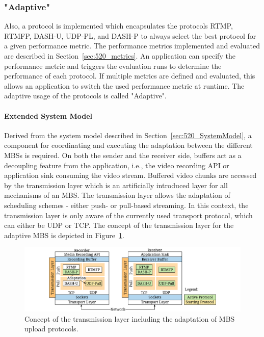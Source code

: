 \subsubsection{"Adaptive"}
Also, a protocol is implemented which encapsulates the protocols \ac{RTMP}, \ac{RTMFP}, \ac{DASH-U}, \ac{UDP-PL}, and \ac{DASH-P} to always select the best protocol for a given performance metric.
The performance metrics implemented and evaluated are described in Section~\ref{sec:520_metrics}.
An application can specify the performance metric and triggers the evaluation runs to determine the performance of each protocol.
If multiple metrics are defined and evaluated, this allows an application to switch the used performance metric at runtime.
The adaptive usage of the protocols is called "Adaptive". 
\paragraph{Extended System Model}
\label{sec:520_extendedSystemModel}
Derived from the system model described in Section~\ref{sec:520_SystemModel}, a component for coordinating and executing the adaptation between the different \ac{MBS}s is required.
On both the sender and the receiver side, buffers act as a decoupling feature from the application, i.e., the video recording \ac{API} or application sink consuming the video stream.
Buffered video chunks are accessed by the transmission layer which is an artificially introduced layer for all mechanisms of an \ac{MBS}.
The transmission layer allows the adaptation of scheduling schemes - either push- or pull-based streaming.
In this context, the transmission layer is only aware of the currently used transport protocol, which can either be \ac{UDP} or \ac{TCP}.
The concept of the transmission layer for the adaptive \ac{MBS} is depicted in Figure~\ref{fig:520_architecture_overview}.
\begin{figure}[tbh]
\centering
\includegraphics[width=\linewidth]{./gfx/500_MobileUpload/architecture_overview_embedded}
\caption[Concept on the transmission layer]{Concept of the transmission layer including the adaptation of \ac{MBS} upload protocols.}
\label{fig:520_architecture_overview}
\end{figure}


